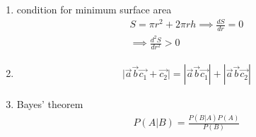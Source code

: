 \documentclass[]{article}
\begin{document}
\begin{enumerate}[label=\thesubsection.\arabic*, ref=\thesubsection.\theenumi]
 \item condition for minimum surface area 
 \begin{align}
     S=\pi r^2+2\pi rh \implies \frac{dS}{dr}=0 \\ \implies \frac{d^2S}{dr^2}>0 \label{eq:ee26btech11222-prob 33}
 \end{align}
 \item 
 \begin{align}
     \vert{}\overrightarrow{a} \overrightarrow{b} \overrightarrow{c_1}+\overrightarrow{c_2}\vert{}=|\overrightarrow{a} \overrightarrow{b} \overrightarrow{c_1}|+|\overrightarrow{a} \overrightarrow{b} \overrightarrow{c_2}|
 \end{align}
 \item Bayes' theorem 
 \begin{align}
     P(A|B)=\frac{P(B|A)P(A)}{P(B)} \label{eq:ee26btech11222-prob 36}
 \end{align}
\end{enumerate}
\end{document}

